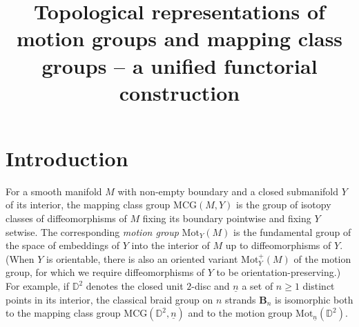 \documentclass[AHL,Unicode,published]{cedram}
\title[Unified topological representations]{Topological representations of motion groups and mapping class groups -- a unified functorial construction}
\author[\initial{M.} \lastname{Palmer}]{\firstname{Martin} \lastname{Palmer}}
\author[\initial{A.} \lastname{Soulié}]{\firstname{Arthur} \lastname{Soulié}}
\newcommand{\MCG}{\mathrm{MCG}}
\newcommand{\Mot}{\mathrm{Mot}}
\newcommand{\B}{\ensuremath{\mathbf{B}}}
\newcommand{\bD}{\mathbb{D}}
\renewcommand{\geq}{\geqslant}
\begin{document}
\shorthandoff{!}
\maketitle


\section*{Introduction}

For a smooth manifold $M$ with non-empty boundary and a closed submanifold $Y$ of its interior, the mapping class group $\MCG(M,Y)$ is the group of isotopy classes of diffeomorphisms of $M$ fixing its boundary pointwise and fixing $Y$ setwise. The corresponding \emph{motion group} $\Mot_{Y}(M)$ is the fundamental group of the space of embeddings of $Y$ into the interior of $M$ up to diffeomorphisms of $Y$. (When $Y$ is orientable, there is also an oriented variant $\Mot_{Y}^{+}(M)$ of the motion group, for which we require diffeomorphisms of $Y$ to be orientation-preserving.) For example, if $\bD^{2}$ denotes the closed unit $2$-disc and $\underline{n}$ a set of $n \geq 1$ distinct points in its interior, the classical braid group on $n$ strands $\B_{n}$ is isomorphic both to the mapping class group $\MCG(\bD^{2},\underline{n})$ and to the motion group $\Mot_{\underline{n}}(\bD^{2})$.
\end{document}
